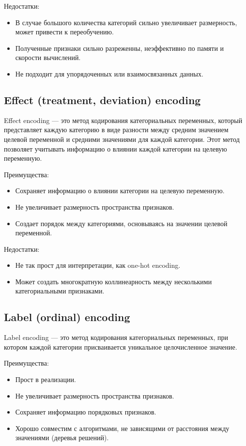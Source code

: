 Недостатки:
\begin{itemize}
	\item В случае большого количества категорий сильно увеличивает размерность, может привести к переобучению.
	\item Полученные признаки сильно разреженны, неэффективно по памяти и скорости вычислений.
	\item Не подходит для упорядоченных или взаимосвязанных данных.
\end{itemize}

\subsection*{Effect (treatment, deviation) encoding}

Effect encoding  — это метод кодирования категориальных переменных, который представляет каждую категорию в виде разности между средним значением целевой переменной и средними значениями для каждой категории. Этот метод позволяет учитывать информацию о влиянии каждой категории на целевую переменную.

Преимущества:
\begin{itemize}
	\item Сохраняет информацию о влиянии категории на целевую переменную.
	\item Не увеличивает размерность пространства признаков.
	\item Создает порядок между категориями, основываясь на значении целевой переменной.
\end{itemize}

Недостатки:
\begin{itemize}
	\item Не так прост для интерпретации, как one-hot encoding.
	\item Может создать многократную коллинеарность между несколькими категориальными признаками.
\end{itemize}

\subsection*{Label (ordinal) encoding}

Label encoding — это метод кодирования категориальных переменных, при котором каждой категории присваивается уникальное целочисленное значение.

Преимущества:
\begin{itemize}
	\item Прост в реализации.
	\item Не увеличивает размерность пространства признаков.
	\item Сохраняет информацию порядковых признаков.
	\item Хорошо совместим с алгоритмами, не зависящими от расстояния между значениями (деревья решений).
\end{itemize}

